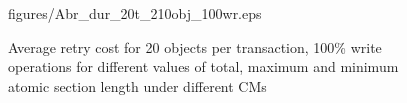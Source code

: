\documentclass[12pt,english]{report}
\begin{document}
\begin{figure}
{{figures/Abr_dur_20t_210obj_100wr.eps}
\label{fig:20t_ecm_rcm_lcm_pnf_210obj_100wr}
}
\caption{Average retry cost for 20 objects per transaction, 100\% write operations for different values of total, maximum and minimum atomic section length under different CMs}
\label{fig:cm_20obj_per_tx_100wr}
\end{figure}
\begin{figure}
\centering

~
~
\subfigure[20 tasks]{
}
\end{figure}
\end{document}
